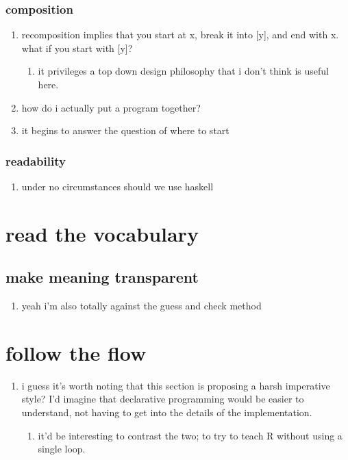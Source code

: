 \documentclass{article}
\begin{document}
	\subsubsection{composition}
	\begin{enumerate}
		\item recomposition implies that you start at x, break it into [y], and end with x. what if you start with [y]?
		\begin{enumerate}
			\item it privileges a top down design philosophy that i don't think is useful here.
		\end{enumerate}
		\item how do i actually put a program together?
		\item it begins to answer the question of where to start
	\end{enumerate}
	\subsubsection{readability}
	\begin{enumerate}
		\item under no circumstances should we use haskell
	\end{enumerate}
	\section{read the vocabulary}
	\subsection{make meaning transparent}
	\begin{enumerate}
		\item yeah i'm also totally against the guess and check method
	\end{enumerate}
	\section{follow the flow}
	\begin{enumerate}
		\item i guess it's worth noting that this section is proposing a harsh imperative style? I'd imagine that declarative programming would be easier to understand, not having to get into the details of the implementation.
		\begin{enumerate}
			\item it'd be interesting to contrast the two; to try to teach R without using a single loop.
		\end{enumerate}
	\end{enumerate}
\end{document}
